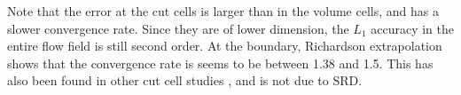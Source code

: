 
Note that the error at the cut cells is larger than in the volume cells, and has a
slower convergence rate. Since they are of lower dimension, the $L_1$
accuracy in the entire flow field is still second order.  At the boundary,
Richardson extrapolation shows that the convergence rate is seems to be
between 1.38 and 1.5.
This has also been found in other cut cell studies \cite{}, and is not due to
SRD.

